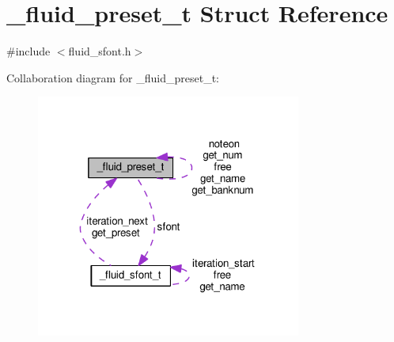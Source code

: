 \hypertarget{struct__fluid__preset__t}{}\section{\+\_\+fluid\+\_\+preset\+\_\+t Struct Reference}
\label{struct__fluid__preset__t}


{\ttfamily \#include $<$fluid\+\_\+sfont.\+h$>$}



Collaboration diagram for \+\_\+fluid\+\_\+preset\+\_\+t\+:
\nopagebreak
\begin{figure}[H]
\begin{center}
\leavevmode
\includegraphics[width=247pt]{struct__fluid__preset__t__coll__graph}
\end{center}
\end{figure}
